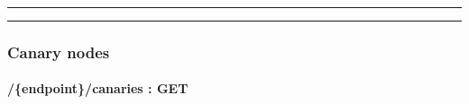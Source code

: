\documentclass[
]{article}
\begin{document}
\begin{center}\rule{0.5\linewidth}{0.5pt}\end{center}

\begin{center}\rule{0.5\linewidth}{0.5pt}\end{center}

\hypertarget{header-n61338}{%
\subsubsection{Canary nodes}\label{header-n61338}}

\hypertarget{header-n61339}{%
\paragraph{/\{endpoint\}/canaries : GET}\label{header-n61339}}
\end{document}
